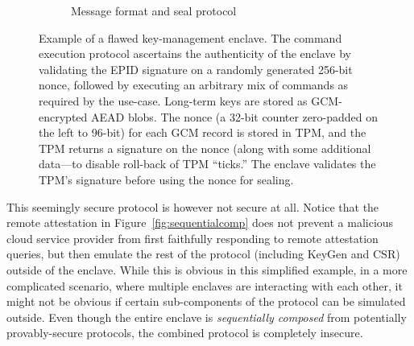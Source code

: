 \documentclass[10pt, letterpaper]{article}
\begin{document}
\begin{figure}[h]
\begin{subfigure}[b]{.5\textwidth}
    \caption{Message format and seal protocol}
    \label{fig:sealprotocol}
  \end{subfigure}
  \caption{Example of a flawed key-management enclave. The command
    execution protocol ascertains the authenticity of the enclave by
    validating the EPID signature on a randomly generated 256-bit
    nonce, followed by executing an arbitrary mix of commands as
    required by the use-case. Long-term keys are stored as
    GCM-encrypted AEAD blobs. The nonce (a 32-bit counter zero-padded
    on the left to 96-bit) for each GCM record is stored in TPM, and
    the TPM returns a signature on the nonce (along with some
    additional data---to disable roll-back of TPM ``ticks.'' The
    enclave validates the TPM's signature before using the nonce for
    sealing.}
  \label{fig:usecase}
  \end{figure}

  This seemingly secure protocol is however not secure at all. Notice
  that the remote attestation in Figure~\ref{fig:sequentialcomp} does
  not prevent a malicious cloud service provider from first faithfully
  responding to remote attestation queries, but then emulate the rest
  of the protocol (including \textsf{KeyGen} and CSR) outside of the
  enclave. While this is obvious in this simplified example, in a more
  complicated scenario, where multiple enclaves are interacting with
  each other, it might not be obvious if certain sub-components of the
  protocol can be simulated outside. Even though the entire enclave is
  \textit{sequentially composed} from potentially provably-secure
  protocols, the combined protocol is completely insecure.
\end{document}
